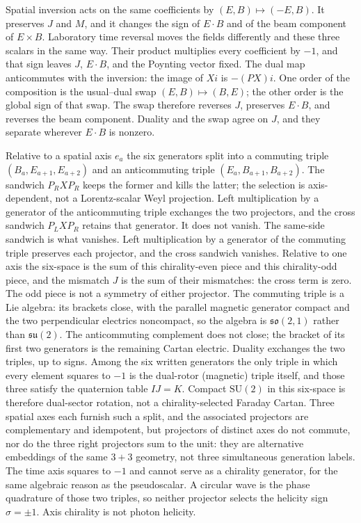 \documentclass[a4paper]{article}
\begin{document}
Spatial inversion acts on the same coefficients by $(E,B)\mapsto(-E,B)$. It preserves $J$ and $M$, and it changes the sign of $E\cdot B$ and of the beam component of $E\times B$. Laboratory time reversal moves the fields differently and these three scalars in the same way. Their product multiplies every coefficient by $-1$, and that sign leaves $J$, $E\cdot B$, and the Poynting vector fixed. The dual map anticommutes with the inversion: the image of $Xi$ is $-(PX)i$. One order of the composition is the usual--dual swap $(E,B)\mapsto(B,E)$; the other order is the global sign of that swap. The swap therefore reverses $J$, preserves $E\cdot B$, and reverses the beam component. Duality and the swap agree on $J$, and they separate wherever $E\cdot B$ is nonzero.

Relative to a spatial axis $e_a$ the six generators split into a commuting triple $(B_a,E_{a+1},E_{a+2})$ and an anticommuting triple $(E_a,B_{a+1},B_{a+2})$. The sandwich $P_R X P_R$ keeps the former and kills the latter; the selection is axis-dependent, not a Lorentz-scalar Weyl projection. Left multiplication by a generator of the anticommuting triple exchanges the two projectors, and the cross sandwich $P_L X P_R$ retains that generator. It does not vanish. The same-side sandwich is what vanishes. Left multiplication by a generator of the commuting triple preserves each projector, and the cross sandwich vanishes. Relative to one axis the six-space is the sum of this chirality-even piece and this chirality-odd piece, and the mismatch $J$ is the sum of their mismatches: the cross term is zero. The odd piece is not a symmetry of either projector. The commuting triple is a Lie algebra: its brackets close, with the parallel magnetic generator compact and the two perpendicular electrics noncompact, so the algebra is $\mathfrak{so}(2,1)$ rather than $\mathfrak{su}(2)$. The anticommuting complement does not close; the bracket of its first two generators is the remaining Cartan electric. Duality exchanges the two triples, up to signs. Among the six written generators the only triple in which every element squares to $-1$ is the dual-rotor (magnetic) triple itself, and those three satisfy the quaternion table $IJ=K$. Compact $\mathrm{SU}(2)$ in this six-space is therefore dual-sector rotation, not a chirality-selected Faraday Cartan. Three spatial axes each furnish such a split, and the associated projectors are complementary and idempotent, but projectors of distinct axes do not commute, nor do the three right projectors sum to the unit: they are alternative embeddings of the same $3+3$ geometry, not three simultaneous generation labels. The time axis squares to $-1$ and cannot serve as a chirality generator, for the same algebraic reason as the pseudoscalar. A circular wave is the phase quadrature of those two triples, so neither projector selects the helicity sign $\sigma=\pm 1$. Axis chirality is not photon helicity.
\end{document}
